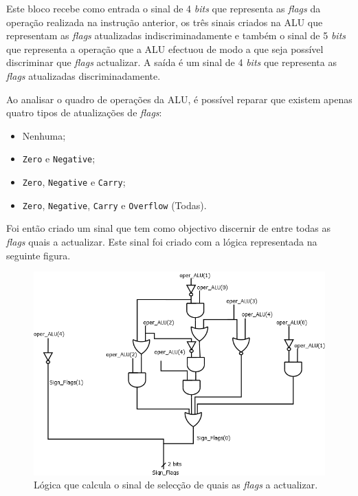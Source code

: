 \documentclass[11pt]{article}
\numberwithin{equation}{section}
\begin{document}
Este bloco recebe como entrada o sinal de 4 \textit{bits} que representa as \textit{flags} da operação realizada na instrução anterior, os três sinais criados na ALU que representam as \textit{flags} atualizadas indiscriminadamente e também o sinal de 5 \textit{bits} que representa a operação que a ALU efectuou de modo a que seja possível discriminar que \textit{flags} actualizar. A saída é um sinal de 4 \textit{bits} que representa as \textit{flags} atualizadas discriminadamente.

Ao analisar o quadro de operações da ALU, é possível reparar que existem apenas quatro tipos de atualizações de \textit{flags}:

\vspace{-2mm}

\begin{itemize}
  \item Nenhuma;
  \vspace{-2.5mm}
  \item \texttt{Zero} e \texttt{Negative};
  \vspace{-2.5mm}
  \item \texttt{Zero}, \texttt{Negative} e \texttt{Carry};
  \vspace{-2.5mm}
  \item \texttt{Zero}, \texttt{Negative}, \texttt{Carry} e \texttt{Overflow} (Todas).
\end{itemize}

Foi então criado um sinal que tem como objectivo discernir de entre todas as \textit{flags} quais a actualizar. Este sinal foi criado com a lógica representada na seguinte figura.

\begin{figure}[H]
	\centering
	\includegraphics[keepaspectratio=true, scale=0.40]{imagens/Sign_Flags}
	\caption{Lógica que calcula o sinal de selecção de quais as \textit{flags} a actualizar.}
	\vspace{-0.8em}
\end{figure}
\end{document}
